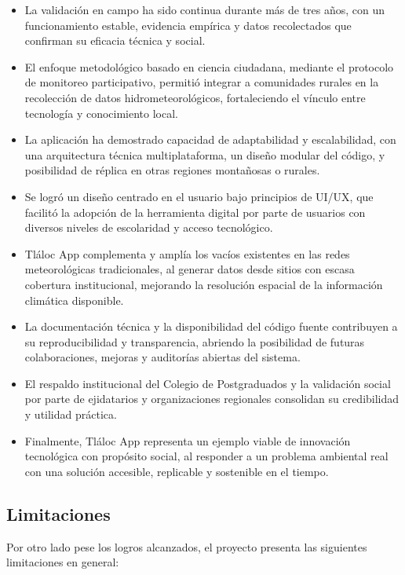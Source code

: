 \begin{itemize}
  \item La validación en campo ha sido continua durante más de tres años, con un funcionamiento estable, evidencia empírica y datos recolectados que confirman su eficacia técnica y social.

  \item El enfoque metodológico basado en ciencia ciudadana, mediante el protocolo de monitoreo participativo, permitió integrar a comunidades rurales en la recolección de datos hidrometeorológicos, fortaleciendo el vínculo entre tecnología y conocimiento local.

  \item La aplicación ha demostrado capacidad de adaptabilidad y escalabilidad, con una arquitectura técnica multiplataforma, un diseño modular del código, y posibilidad de réplica en otras regiones montañosas o rurales.

  \item Se logró un diseño centrado en el usuario bajo principios de UI/UX, que facilitó la adopción de la herramienta digital por parte de usuarios con diversos niveles de escolaridad y acceso tecnológico.

  \item Tláloc App complementa y amplía los vacíos existentes en las redes meteorológicas tradicionales, al generar datos desde sitios con escasa cobertura institucional, mejorando la resolución espacial de la información climática disponible.

  \item La documentación técnica y la disponibilidad del código fuente contribuyen a su reproducibilidad y transparencia, abriendo la posibilidad de futuras colaboraciones, mejoras y auditorías abiertas del sistema.

  \item El respaldo institucional del Colegio de Postgraduados y la validación social por parte de ejidatarios y organizaciones regionales consolidan su credibilidad y utilidad práctica.

  \item Finalmente, Tláloc App representa un ejemplo viable de innovación tecnológica con propósito social, al responder a un problema ambiental real con una solución accesible, replicable y sostenible en el tiempo.
\end{itemize}


\subsection{Limitaciones}
Por otro lado pese los logros alcanzados, el proyecto presenta las siguientes limitaciones en general:

